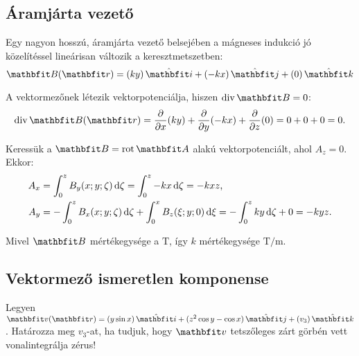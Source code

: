 \documentclass{szb-practice}
\begin{document}
\subsection{Áramjárta vezető}

Egy nagyon hosszú, áramjárta vezető belsejében a mágneses indukció jó
közelítéssel lineárisan változik a keresztmetszetben:
$$
  \rvec B(\coordv) = \ijk{ky}{-kx}{0}
$$

A vektormezőnek létezik vektorpotenciálja, hiszen $\Div \rvec B = 0$:
$$
  \Div \rvec B(\coordv)
  = \pdv{}{x}(ky) + \pdv{}{y}(-kx) + \pdv{}{z}(0)
  = 0 + 0 + 0
  = 0
  \text.
$$

Keressük a $\rvec B = \rot \rvec A$ alakú vektorpotenciált, ahol $A_z = 0$.
Ekkor:
\begin{align*}
  A_x & = \int_0^z B_y(x; y; \zeta) \mathop{}\!\mathrm{d} \zeta = \int_0^z -kx \mathop{}\!\mathrm{d} \zeta = -kxz
  \text,                                                                         \\
  A_y & = -\int_0^z B_x(x; y; \zeta) \mathop{}\!\mathrm{d} \zeta + \int_0^x B_z(\xi; y; 0) \mathop{}\!\mathrm{d} \xi
  = -\int_0^z ky \mathop{}\!\mathrm{d} \zeta + 0 = -kyz
  \text.
\end{align*}

Mivel $\rvec B$ mértékegysége a $\si{\tesla}$, így $k$ mértékegysége
$\si{\tesla\per\meter}$.


\subsection{Vektormező ismeretlen komponense}

Legyen $\rvec v(\coordvec) = \ijk{y \sin x}{z^2 \cos y - \cos x}{v_3}$.
Határozza meg $v_3$-at, ha tudjuk, hogy $\rvec v$ tetszőleges zárt
görbén vett vonalintegrálja zérus!
\end{document}
